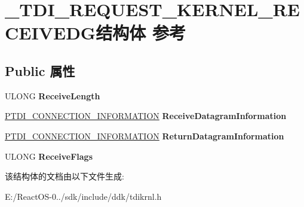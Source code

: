 \hypertarget{struct___t_d_i___r_e_q_u_e_s_t___k_e_r_n_e_l___r_e_c_e_i_v_e_d_g}{}\section{\+\_\+\+T\+D\+I\+\_\+\+R\+E\+Q\+U\+E\+S\+T\+\_\+\+K\+E\+R\+N\+E\+L\+\_\+\+R\+E\+C\+E\+I\+V\+E\+D\+G结构体 参考}
\label{struct___t_d_i___r_e_q_u_e_s_t___k_e_r_n_e_l___r_e_c_e_i_v_e_d_g}
\subsection*{Public 属性}
\begin{DoxyCompactItemize}
\item 
\mbox{\label{struct___t_d_i___r_e_q_u_e_s_t___k_e_r_n_e_l___r_e_c_e_i_v_e_d_g_a0af7bfc290d99cfa0bd5c1b22015ce48}} 
U\+L\+O\+NG {\bfseries Receive\+Length}
\item 
\mbox{\label{struct___t_d_i___r_e_q_u_e_s_t___k_e_r_n_e_l___r_e_c_e_i_v_e_d_g_a1ed283f6504090cdbe213c7a67dbca90}} 
\hyperlink{struct___t_d_i___c_o_n_n_e_c_t_i_o_n___i_n_f_o_r_m_a_t_i_o_n}{P\+T\+D\+I\+\_\+\+C\+O\+N\+N\+E\+C\+T\+I\+O\+N\+\_\+\+I\+N\+F\+O\+R\+M\+A\+T\+I\+ON} {\bfseries Receive\+Datagram\+Information}
\item 
\mbox{\label{struct___t_d_i___r_e_q_u_e_s_t___k_e_r_n_e_l___r_e_c_e_i_v_e_d_g_ac487030b4aa6726f33f533b1c524d997}} 
\hyperlink{struct___t_d_i___c_o_n_n_e_c_t_i_o_n___i_n_f_o_r_m_a_t_i_o_n}{P\+T\+D\+I\+\_\+\+C\+O\+N\+N\+E\+C\+T\+I\+O\+N\+\_\+\+I\+N\+F\+O\+R\+M\+A\+T\+I\+ON} {\bfseries Return\+Datagram\+Information}
\item 
\mbox{\label{struct___t_d_i___r_e_q_u_e_s_t___k_e_r_n_e_l___r_e_c_e_i_v_e_d_g_ac386531471acd7a5fbbdcd671a480e16}} 
U\+L\+O\+NG {\bfseries Receive\+Flags}
\end{DoxyCompactItemize}


该结构体的文档由以下文件生成\+:\begin{DoxyCompactItemize}
\item 
E\+:/\+React\+O\+S-\/0../sdk/include/ddk/tdikrnl.\+h\end{DoxyCompactItemize}

